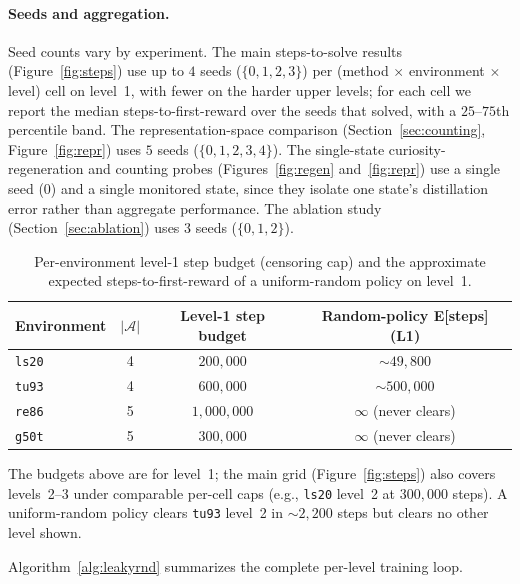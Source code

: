 \documentclass{article}
\begin{document}
\paragraph{Seeds and aggregation.} Seed counts vary by experiment. The main
steps-to-solve results (Figure~\ref{fig:steps}) use up to $4$ seeds
($\{0,1,2,3\}$) per (method $\times$ environment $\times$ level) cell on level~1,
with fewer on the harder upper levels; for each cell we report the median
steps-to-first-reward over the seeds that solved, with a $25$--$75$th percentile
band. The representation-space comparison (Section~\ref{sec:counting},
Figure~\ref{fig:repr}) uses $5$ seeds ($\{0,1,2,3,4\}$). The single-state
curiosity-regeneration and counting probes (Figures~\ref{fig:regen}
and~\ref{fig:repr}) use a single seed ($0$) and a single monitored state, since
they isolate one state's distillation error rather than aggregate performance.
The ablation study (Section~\ref{sec:ablation}) uses $3$ seeds ($\{0,1,2\}$).

\begin{table}[h]
\centering
\caption{Per-environment level-1 step budget (censoring cap) and the approximate
expected steps-to-first-reward of a uniform-random policy on level~1.}
\label{tab:budget}
\begin{tabular}{lccc}
\toprule
Environment & $|\mathcal{A}|$ & Level-1 step budget & Random-policy E[steps] (L1) \\
\midrule
\texttt{ls20} & 4 & $200{,}000$    & ${\sim}49{,}800$ \\
\texttt{tu93} & 4 & $600{,}000$    & ${\sim}500{,}000$ \\
\texttt{re86} & 5 & $1{,}000{,}000$ & $\infty$ (never clears) \\
\texttt{g50t} & 5 & $300{,}000$    & $\infty$ (never clears) \\
\bottomrule
\end{tabular}
\end{table}

The budgets above are for level~1; the main grid (Figure~\ref{fig:steps}) also
covers levels~2--3 under comparable per-cell caps (e.g., \texttt{ls20} level~2 at
$300{,}000$ steps). A
uniform-random policy clears \texttt{tu93} level~2 in ${\sim}2{,}200$ steps but
clears no other level shown.

Algorithm~\ref{alg:leakyrnd} summarizes the complete per-level training loop.
\end{document}
